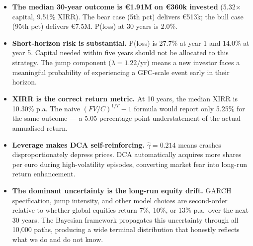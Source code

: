 \documentclass[11pt, a4paper]{article}
\begin{document}
\begin{summarybox}[title=Conclusions]
\begin{itemize}[leftmargin=1.2em, itemsep=4pt]

  \item \textbf{The median 30-year outcome is \euro{}1.91M on \euro{}360k invested} (5.32$\times$ capital, 9.51\% XIRR). The bear case (5th pct) delivers \euro{}513k; the bull case (95th pct) delivers \euro{}7.5M. P(loss) at 30 years is 2.0\%.

  \item \textbf{Short-horizon risk is substantial.} P(loss) is 27.7\% at year 1 and 14.0\% at year 5. Capital needed within five years should not be allocated to this strategy. The jump component ($\lambda=1.22$/yr) means a new investor faces a meaningful probability of experiencing a GFC-scale event early in their horizon.

  \item \textbf{XIRR is the correct return metric.} At 10 years, the median XIRR is 10.30\% p.a. The naive $(FV/C)^{1/T}-1$ formula would report only 5.25\% for the same outcome --- a 5.05 percentage point understatement of the actual annualised return.

  \item \textbf{Leverage makes DCA self-reinforcing.} $\hat\gamma=0.214$ means crashes disproportionately depress prices. DCA automatically acquires more shares per euro during high-volatility episodes, converting market fear into long-run return enhancement.

  \item \textbf{The dominant uncertainty is the long-run equity drift.} GARCH specification, jump intensity, and other model choices are second-order relative to whether global equities return 7\%, 10\%, or 13\% p.a.\ over the next 30 years. The Bayesian framework propagates this uncertainty through all 10{,}000 paths, producing a wide terminal distribution that honestly reflects what we do and do not know.

\end{itemize}
\end{summarybox}
\end{document}
